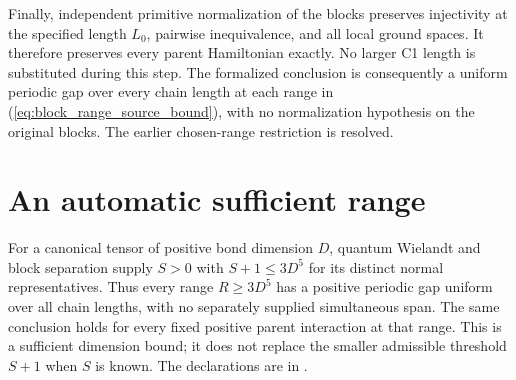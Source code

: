 \documentclass{article}
\begin{document}
Finally, independent primitive normalization of the blocks preserves
injectivity at the specified length $L_0$, pairwise inequivalence, and all
local ground spaces. It therefore preserves every parent Hamiltonian exactly.
No larger C1 length is substituted during this step. The formalized conclusion
is consequently a uniform periodic gap over every chain length at each range in
(\ref{eq:block_range_source_bound}), with no normalization hypothesis on the
original blocks. The earlier chosen-range restriction is resolved.

\section{An automatic sufficient range}

For a canonical tensor of positive bond dimension $D$, quantum Wielandt and
block separation supply $S>0$ with $S+1\leq3D^5$ for its distinct normal
representatives. Thus every range $R\geq3D^5$ has a positive periodic gap
uniform over all chain lengths, with no separately supplied simultaneous
span. The same conclusion holds for every fixed positive parent interaction
at that range. This is a sufficient dimension bound; it does not replace the
smaller admissible threshold $S+1$ when $S$ is known. The declarations are in
.



\end{document}
